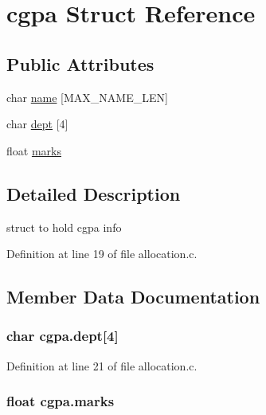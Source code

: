 \hypertarget{structcgpa}{
\section{cgpa Struct Reference}
\label{structcgpa}
}
\subsection*{Public Attributes}
\begin{DoxyCompactItemize}
\item 
char \hyperlink{structcgpa_a4d971d968022affbe8670220fea9c34b}{name} \mbox{[}MAX\_\-NAME\_\-LEN\mbox{]}
\item 
char \hyperlink{structcgpa_a9863e09e4c26b3f711707ec894044031}{dept} \mbox{[}4\mbox{]}
\item 
float \hyperlink{structcgpa_aeae583a9994da725e72120846f307087}{marks}
\end{DoxyCompactItemize}


\subsection{Detailed Description}
struct to hold cgpa info 

Definition at line 19 of file allocation.c.



\subsection{Member Data Documentation}
\hypertarget{structcgpa_a9863e09e4c26b3f711707ec894044031}{
\subsubsection[{dept}]{\setlength{\rightskip}{0pt plus 5cm}char {\bf cgpa.dept}\mbox{[}4\mbox{]}}}
\label{structcgpa_a9863e09e4c26b3f711707ec894044031}


Definition at line 21 of file allocation.c.

\hypertarget{structcgpa_aeae583a9994da725e72120846f307087}{
\subsubsection[{marks}]{\setlength{\rightskip}{0pt plus 5cm}float {\bf cgpa.marks}}}
\label{structcgpa_aeae583a9994da725e72120846f307087}


